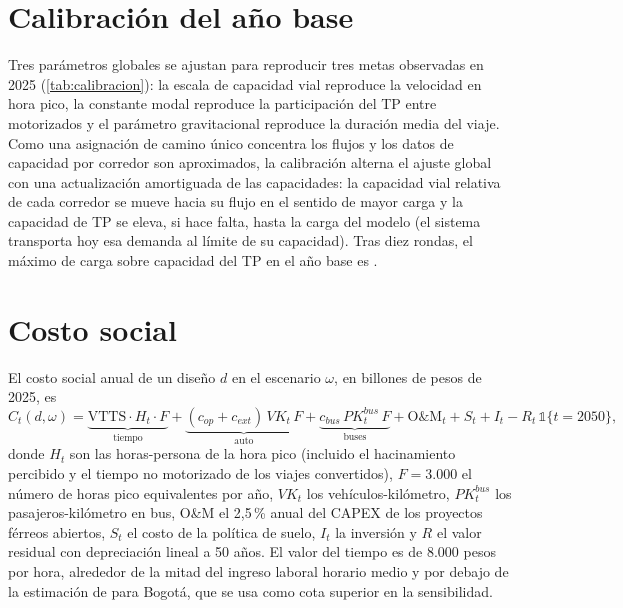 \section{Calibración del año base}\label{sec:calibracion}

Tres parámetros globales se ajustan para reproducir tres metas observadas en 2025
(\cref{tab:calibracion}): la escala de capacidad vial reproduce la velocidad en hora pico, la constante
modal reproduce la participación del TP entre motorizados y el parámetro gravitacional reproduce la
duración media del viaje. Como una asignación de camino único concentra los flujos y los datos de
capacidad por corredor son aproximados, la calibración alterna el ajuste global con una actualización
amortiguada de las capacidades: la capacidad vial relativa de cada corredor se mueve hacia su flujo en
el sentido de mayor carga y la capacidad de TP se eleva, si hace falta, hasta la carga del modelo (el
sistema transporta hoy esa demanda al límite de su capacidad). Tras diez rondas, el máximo de carga sobre
capacidad del TP en el año base es \HacinamientoBase.

\begin{table}[ht]
\centering\small
\caption{Calibración del año base 2025.}\label{tab:calibracion}

\end{table}

\section{Costo social}\label{sec:costo}

El costo social anual de un diseño $d$ en el escenario $\omega$, en billones de pesos de 2025, es
\begin{equation}\label{eq:costo}
C_t(d,\omega)=\underbrace{\mathrm{VTTS}\cdot H_t\cdot F}_{\text{tiempo}}
+\underbrace{(c_{op}+c_{ext})\,VK_t\,F}_{\text{auto}}
+\underbrace{c_{bus}\,PK^{bus}_t\,F}_{\text{buses}}
+\mathrm{O\&M}_t+S_t+I_t-R_t\,\mathbb 1\{t=2050\},
\end{equation}
donde $H_t$ son las horas-persona de la hora pico (incluido el hacinamiento percibido y el tiempo no
motorizado de los viajes convertidos), $F=3.000$ el número de horas pico equivalentes por año, $VK_t$
los vehículos-kilómetro, $PK^{bus}_t$ los pasajeros-kilómetro en bus, O\&M el 2,5\,\% anual del CAPEX de
los proyectos férreos abiertos, $S_t$ el costo de la política de suelo, $I_t$ la inversión y $R$ el
valor residual con depreciación lineal a 50 años. El valor del tiempo es de 8.000 pesos por hora,
alrededor de la mitad del ingreso laboral horario medio y por debajo de la estimación de
\citet{gutierrez2014} para Bogotá, que se usa como cota superior en la sensibilidad.

